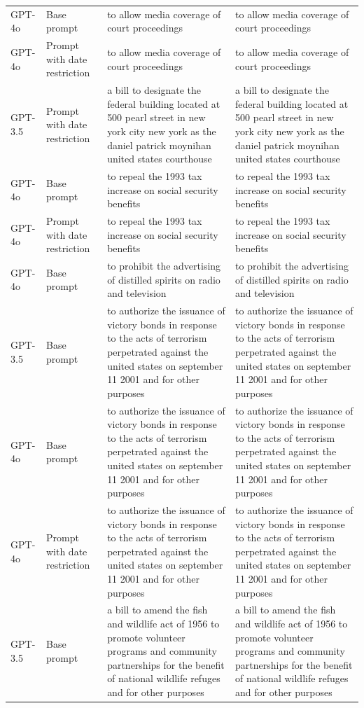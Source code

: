 \begin{longtable}{>{\raggedright\arraybackslash}p{1.4cm}>{\raggedright\arraybackslash}p{1.4cm}>{\raggedright\arraybackslash}p{5.5cm}>{\raggedright\arraybackslash}p{5.5cm}}
GPT-4o & Base prompt & to allow media coverage of court proceedings & to allow media coverage of court proceedings\\
GPT-4o & Prompt with date restriction & to allow media coverage of court proceedings & to allow media coverage of court proceedings\\
GPT-3.5 & Prompt with date restriction & a bill to designate the federal building located at 500 pearl street in new york city new york as the daniel patrick moynihan united states courthouse & a bill to designate the federal building located at 500 pearl street in new york city new york as the daniel patrick moynihan united states courthouse\\
GPT-4o & Base prompt & to repeal the 1993 tax increase on social security benefits & to repeal the 1993 tax increase on social security benefits\\
GPT-4o & Prompt with date restriction & to repeal the 1993 tax increase on social security benefits & to repeal the 1993 tax increase on social security benefits\\
GPT-4o & Base prompt & to prohibit the advertising of distilled spirits on radio and television & to prohibit the advertising of distilled spirits on radio and television\\
GPT-3.5 & Base prompt & to authorize the issuance of victory bonds in response to the acts of terrorism perpetrated against the united states on september 11 2001 and for other purposes & to authorize the issuance of victory bonds in response to the acts of terrorism perpetrated against the united states on september 11 2001 and for other purposes\\
GPT-4o & Base prompt & to authorize the issuance of victory bonds in response to the acts of terrorism perpetrated against the united states on september 11 2001 and for other purposes & to authorize the issuance of victory bonds in response to the acts of terrorism perpetrated against the united states on september 11 2001 and for other purposes\\
GPT-4o & Prompt with date restriction & to authorize the issuance of victory bonds in response to the acts of terrorism perpetrated against the united states on september 11 2001 and for other purposes & to authorize the issuance of victory bonds in response to the acts of terrorism perpetrated against the united states on september 11 2001 and for other purposes\\
GPT-3.5 & Base prompt & a bill to amend the fish and wildlife act of 1956 to promote volunteer programs and community partnerships for the benefit of national wildlife refuges and for other purposes & a bill to amend the fish and wildlife act of 1956 to promote volunteer programs and community partnerships for the benefit of national wildlife refuges and for other purposes\\

\end{longtable}

